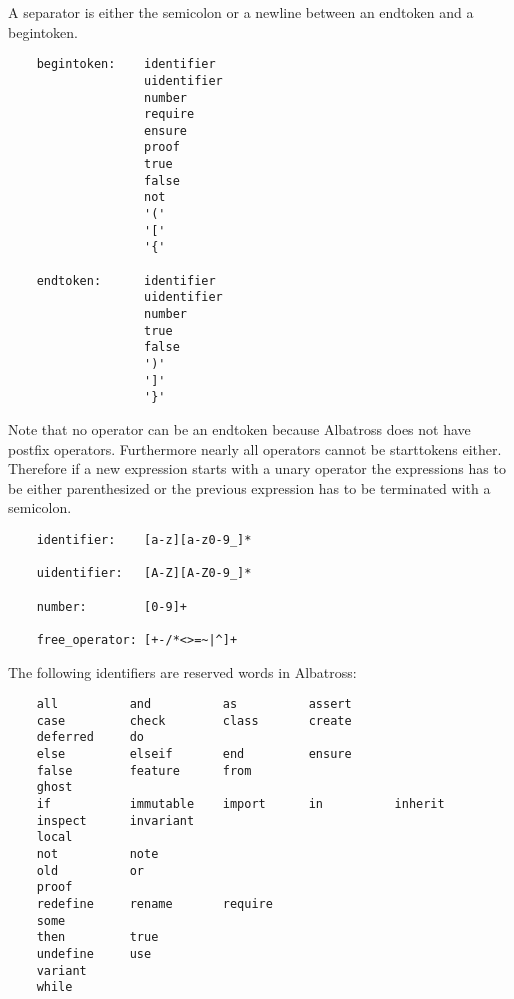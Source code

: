 \newcommand {\semicol}{\lstinline!;!}

A separator is either the semicolon or a newline between an endtoken and a
begintoken.

\begin{lstlisting}
    begintoken:    identifier
                   uidentifier
                   number
                   require
                   ensure
                   proof
                   true
                   false
                   not
                   '('
                   '['
                   '{'

    endtoken:      identifier
                   uidentifier
                   number
                   true
                   false
                   ')'
                   ']'
                   '}'
\end{lstlisting}
Note that no operator can be an endtoken because Albatross does not have
postfix operators. Furthermore nearly all operators cannot be starttokens
either. Therefore if a new expression starts with a unary operator the
expressions has to be either parenthesized or the previous expression has to
be terminated with a semicolon.

\begin{lstlisting}
    identifier:    [a-z][a-z0-9_]*

    uidentifier:   [A-Z][A-Z0-9_]*

    number:        [0-9]+

    free_operator: [+-/*<>=~|^]+
\end{lstlisting}

\noindent The following identifiers are reserved words in Albatross:
\begin{lstlisting}
    all          and          as          assert
    case         check        class       create
    deferred     do
    else         elseif       end         ensure
    false        feature      from
    ghost
    if           immutable    import      in          inherit
    inspect      invariant
    local
    not          note
    old          or
    proof
    redefine     rename       require
    some
    then         true
    undefine     use
    variant
    while
\end{lstlisting}



